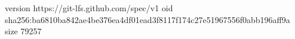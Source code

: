 version https://git-lfs.github.com/spec/v1
oid sha256:ba6810ba842ae4be376ea4df01ead3f8117f174c27e51967556f0abb196aff9a
size 79257
